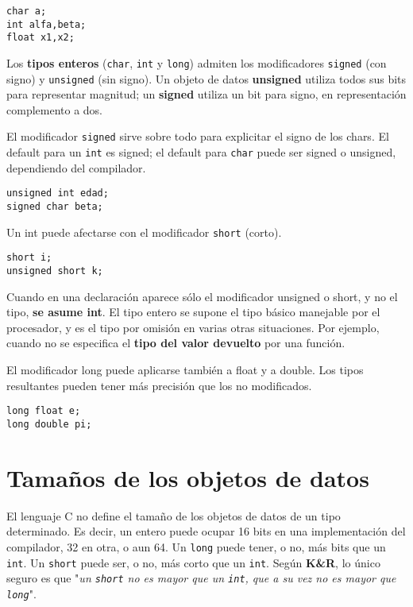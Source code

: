 \begin{lstlisting}
char a;
int alfa,beta;
float x1,x2;
\end{lstlisting}

Los \textbf{tipos enteros} (\lstinline{char}, \lstinline{int} y \lstinline{long}) admiten los modificadores \lstinline{signed} (con signo) y \lstinline{unsigned} (sin signo). Un objeto de datos \textbf{unsigned} utiliza todos sus bits para representar magnitud; un \textbf{signed} utiliza un bit para signo, en representación complemento a dos.

El modificador \lstinline{signed} sirve sobre todo para explicitar el signo de los chars. El default para un \lstinline{int} es
signed; el default para \lstinline{char} puede ser signed o unsigned, dependiendo del compilador.

\begin{lstlisting}
unsigned int edad;
signed char beta;
\end{lstlisting}


Un int puede afectarse con el modificador \lstinline{short} (corto).

\begin{lstlisting}
short i;
unsigned short k;
\end{lstlisting}


Cuando en una declaración aparece sólo el modificador unsigned o short, y no el tipo, \textbf{se asume int}. El
tipo entero se supone el tipo básico manejable por el procesador, y es el tipo por omisión en varias
otras situaciones. Por ejemplo, cuando no se especifica el \textbf{tipo del valor devuelto} por una función.

El modificador long puede aplicarse también a float y a double. Los tipos resultantes pueden tener más
precisión que los no modificados.

\begin{lstlisting}
long float e; 
long double pi;
\end{lstlisting}

\section{Tamaños de los objetos de datos}

El lenguaje C no define el tamaño de los objetos de datos de un tipo determinado. Es decir, un entero
puede ocupar 16 bits en una implementación del compilador, 32 en otra, o aun 64. Un \lstinline{long} puede tener, o no, más bits
que un \lstinline{int}. Un \lstinline{short} puede ser, o no, más corto que un \lstinline{int}. Según \textbf{K\&R}, lo único seguro es que "\textit{un \lstinline{short} no es mayor que un \lstinline{int}, que a su vez no es mayor que \lstinline{long}}".

